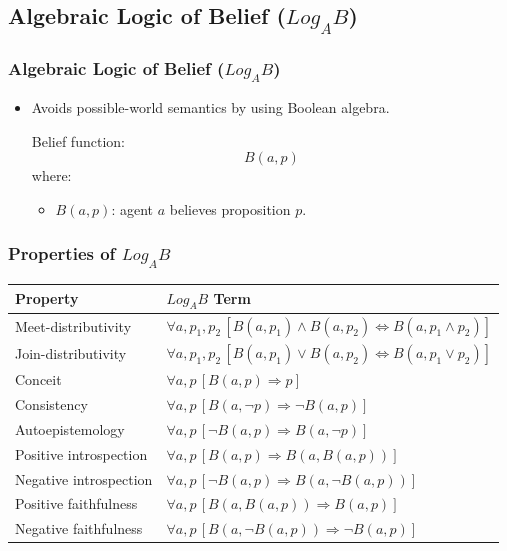\documentclass[aspectratio=169]{beamer}
\begin{document}
\subsection{Algebraic Logic of Belief ($Log_AB$)}
\begin{frame}
\frametitle{Algebraic Logic of Belief ($Log_AB$)}
\Large
\begin{itemize}
    \item Avoids possible-world semantics by using Boolean algebra.
    \begin{block}{Belief function:}
    \[
    B(a, p)
    \]
    \normalsize where:
    \begin{itemize}
        \item $B(a, p)$: agent $a$ believes proposition $p$.
    \end{itemize}
    \end{block}
\end{itemize}
\end{frame}

\begin{frame}
\frametitle{Properties of $Log_AB$}
\centering
{\small
\renewcommand{\arraystretch}{1.5}
\begin{tabular}{|p{4cm}|p{9.5cm}|}
    \hline
    \textbf{Property} & \textbf{$Log_AB$ Term} \\
    \hline
    Meet-distributivity & $\forall a, p_1, p_2\,[B(a, p_1) \wedge B(a, p_2) \Leftrightarrow B(a, p_1 \wedge p_2)]$ \\
    \hline
    Join-distributivity & $\forall a, p_1, p_2\,[B(a, p_1) \vee B(a, p_2) \Leftrightarrow B(a, p_1 \vee p_2)]$ \\
    \hline
    Conceit & $\forall a, p\,[B(a, p) \Rightarrow p]$ \\
    \hline
    Consistency & $\forall a, p\,[B(a, \neg p) \Rightarrow \neg B(a, p)]$ \\
    \hline
    Autoepistemology & $\forall a, p\,[\neg B(a, p) \Rightarrow B(a, \neg p)]$ \\
    \hline
    Positive introspection & $\forall a, p\,[B(a, p) \Rightarrow B(a, B(a, p))]$ \\
    \hline
    Negative introspection & $\forall a, p\,[\neg B(a, p) \Rightarrow B(a, \neg B(a, p))]$ \\
    \hline
    Positive faithfulness & $\forall a, p\,[B(a, B(a, p)) \Rightarrow B(a, p)]$ \\
    \hline
    Negative faithfulness & $\forall a, p\,[B(a, \neg B(a, p)) \Rightarrow \neg B(a, p)]$ \\
    \hline
\end{tabular}
}
\end{frame}
\end{document}
